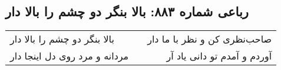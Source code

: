 \begin{center}
\section*{رباعی شماره ۸۸۳: بالا بنگر دو چشم را بالا دار}
\label{sec:0883}
\begin{longtable}{l p{0.5cm} r}
بالا بنگر دو چشم را بالا دار
&&
صاحب‌نظری کن و نظر با ما دار
\\
مردانه و مرد روی دل اینجا دار
&&
آوردم و آمدم تو دانی یاد آر
\\
\end{longtable}
\end{center}
